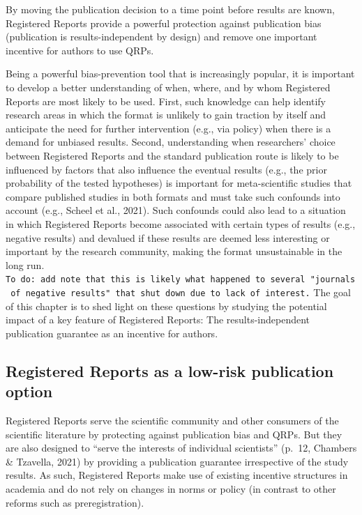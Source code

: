 \documentclass[
  ,man,mask,floatsintext]{apa6}
\begin{document}
By moving the publication decision to a time point before results are known, Registered Reports provide a powerful protection against publication bias (publication is results-independent by design) and remove one important incentive for authors to use QRPs.

Being a powerful bias-prevention tool that is increasingly popular, it is important to develop a better understanding of when, where, and by whom Registered Reports are most likely to be used.
First, such knowledge can help identify research areas in which the format is unlikely to gain traction by itself and anticipate the need for further intervention (e.g., via policy) when there is a demand for unbiased results.
Second, understanding when researchers' choice between Registered Reports and the standard publication route is likely to be influenced by factors that also influence the eventual results (e.g., the prior probability of the tested hypotheses) is important for meta-scientific studies that compare published studies in both formats and must take such confounds into account (e.g., Scheel et al., 2021).
Such confounds could also lead to a situation in which Registered Reports become associated with certain types of results (e.g., negative results) and devalued if these results are deemed less interesting or important by the research community, making the format unsustainable in the long run. \texttt{To\ do:\ add\ note\ that\ this\ is\ likely\ what\ happened\ to\ several\ "journals\ of\ negative\ results"\ that\ shut\ down\ due\ to\ lack\ of\ interest.}
The goal of this chapter is to shed light on these questions by studying the potential impact of a key feature of Registered Reports: The results-independent publication guarantee as an incentive for authors.

\hypertarget{registered-reports-as-a-low-risk-publication-option}{%
\subsection{Registered Reports as a low-risk publication option}\label{registered-reports-as-a-low-risk-publication-option}}

Registered Reports serve the scientific community and other consumers of the scientific literature by protecting against publication bias and QRPs.
But they are also designed to ``serve the interests of individual scientists'' (p.~12, Chambers \& Tzavella, 2021) by providing a publication guarantee irrespective of the study results.
As such, Registered Reports make use of existing incentive structures in academia and do not rely on changes in norms or policy (in contrast to other reforms such as preregistration).
\end{document}
